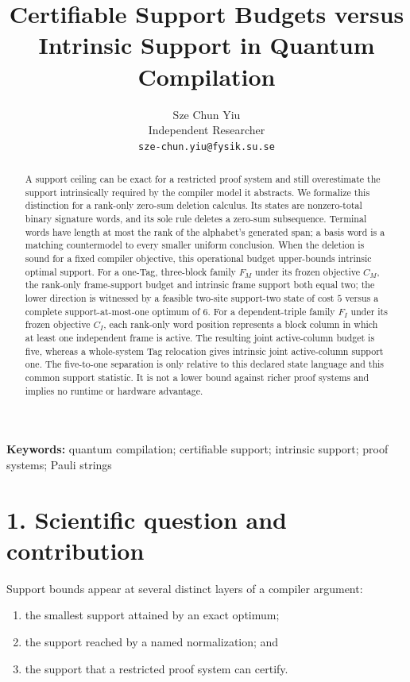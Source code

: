 \documentclass[11pt]{article}
\title{Certifiable Support Budgets versus Intrinsic Support in Quantum Compilation}
\author{Sze Chun Yiu\\Independent Researcher\\\texttt{sze-chun.yiu@fysik.su.se}}
\date{}
\providecommand{\tightlist}{\setlength{\itemsep}{0pt}\setlength{\parskip}{0pt}}
\begin{document}
\maketitle
\begin{abstract}
A support ceiling can be exact for a restricted proof system and still overestimate the support intrinsically required by the compiler model it abstracts. We formalize this distinction for a rank-only zero-sum deletion calculus. Its states are nonzero-total binary signature words, and its sole rule deletes a zero-sum subsequence. Terminal words have length at most the rank of the alphabet's generated span; a basis word is a matching countermodel to every smaller uniform conclusion. When the deletion is sound for a fixed compiler objective, this operational budget upper-bounds intrinsic optimal support. For a one-Tag, three-block family \(F_M\) under its frozen objective \(C_M\), the rank-only frame-support budget and intrinsic frame support both equal two; the lower direction is witnessed by a feasible two-site support-two state of cost \(5\) versus a complete support-at-most-one optimum of \(6\). For a dependent-triple family \(F_I\) under its frozen objective \(C_I\), each rank-only word position represents a block column in which at least one independent frame is active. The resulting joint active-column budget is five, whereas a whole-system Tag relocation gives intrinsic joint active-column support one. The five-to-one separation is only relative to this declared state language and this common support statistic. It is not a lower bound against richer proof systems and implies no runtime or hardware advantage.
\end{abstract}
\noindent\textbf{Keywords:} quantum compilation; certifiable support; intrinsic support; proof systems; Pauli strings

\hypertarget{scientific-question-and-contribution}{%
\section*{1. Scientific question and contribution}\label{scientific-question-and-contribution}}

Support bounds appear at several distinct layers of a compiler argument:

\begin{enumerate}
\def\labelenumi{\arabic{enumi}.}
\tightlist
\item
  the smallest support attained by an exact optimum;
\item
  the support reached by a named normalization; and
\item
  the support that a restricted proof system can certify.
\end{enumerate}
\end{document}
